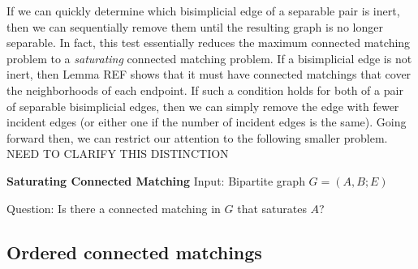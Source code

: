 If we can quickly determine which bisimplicial edge of a separable pair is inert, then we can sequentially remove them until the resulting graph is no longer separable.  
%
In fact, this test essentially reduces the maximum connected matching problem to a {\it saturating } connected matching problem.  
%
If a bisimplicial edge is not inert, then Lemma REF shows that it must have connected matchings that cover the neighborhoods of each endpoint.  
%
If such a condition holds for both of a pair of separable bisimplicial edges, then we can simply remove the edge with fewer incident edges (or either one if the number of incident edges is the same).  
%
Going forward then, we can restrict our attention to the following smaller problem.  NEED TO CLARIFY THIS DISTINCTION
\begin{framed}\noindent\textbf{Saturating Connected Matching}
	\vskip 0.5cm
	\noindent Input: Bipartite graph $G = (A,B;E)$
	
	\noindent Question: Is there a connected matching in $G$ that saturates $A$?
\end{framed}
\subsection{Ordered connected matchings}

